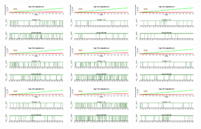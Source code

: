 \begin{figure}[th]
\centering
\includegraphics[width=0.30\textwidth]{Figures/Success_Exp1_P1} \includegraphics[width=0.30\textwidth]{Figures/Success_Exp1_P2} \includegraphics[width=0.30\textwidth]{Figures/Success_Exp1_P3}
\includegraphics[width=0.30\textwidth]{Figures/Success_Exp1_P4} \includegraphics[width=0.30\textwidth]{Figures/Success_Exp1_P5} \includegraphics[width=0.30\textwidth]{Figures/Success_Exp1_P6}
\includegraphics[width=0.30\textwidth]{Figures/Success_Exp1_P7} \includegraphics[width=0.30\textwidth]{Figures/Success_Exp1_P8} \includegraphics[width=0.30\textwidth]{Figures/Success_Exp1_P9}

\end{figure}
